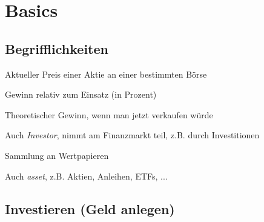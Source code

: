 \documentclass{beamer}
\begin{document}
	\begin{frame}
		\tableofcontents[hidesubsections]
	\end{frame}
	
	\section{Basics}
	
		\begin{frame}
		\end{frame}
	
		\subsection{Begrifflichkeiten}
		
		\begin{frame}
			\begin{description}[labelwidth=0cm]
				\item[Kurs] Aktueller Preis einer Aktie an einer bestimmten Börse\pause
				\item[Rendite] Gewinn relativ zum Einsatz (in Prozent)\pause
				\item[Buchgewinn] Theoretischer Gewinn, wenn man jetzt verkaufen würde\pause
				\item[Anleger] Auch \textit{Investor}, nimmt am Finanzmarkt teil, z.B. durch Investitionen\pause
				\item[Portfolio] Sammlung an Wertpapieren\pause
				\item[Wertpapier] Auch \textit{asset}, z.B. Aktien, Anleihen, ETFs, ...
			\end{description}
		\end{frame}
		
		\subsection{Investieren (Geld anlegen)}
		
\end{document}
